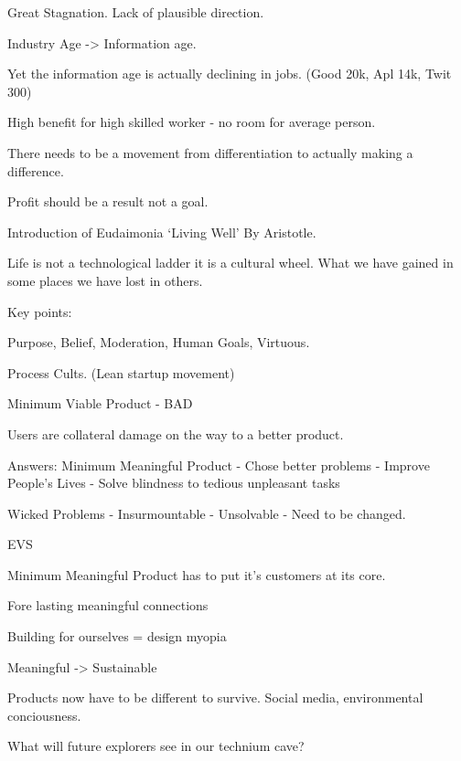 Great Stagnation. Lack of plausible direction.

Industry Age -> Information age.

Yet the information age is actually declining in jobs. (Good 20k, Apl 14k, Twit 300)

High benefit for high skilled worker - no room for average person.

There needs to be a movement from differentiation to actually making a difference.

Profit should be a result not a goal.

Introduction of Eudaimonia `Living Well' By Aristotle. 

Life is not a technological ladder it is a cultural wheel. What we have gained in some places we have lost in others.

Key points:

Purpose, Belief, Moderation, Human Goals, Virtuous.

Process Cults. (Lean startup movement)

Minimum Viable Product - BAD

Users are collateral damage on the way to a better product.

Answers: Minimum Meaningful Product
- Chose better problems
- Improve People's Lives
- Solve blindness to tedious unpleasant tasks

Wicked Problems
- Insurmountable
- Unsolvable
- Need to be changed.

EVS

Minimum Meaningful Product has to put it's customers at its core.

Fore lasting meaningful connections

Building for ourselves = design myopia

Meaningful -> Sustainable

Products now have to be different to survive. Social media, environmental conciousness.

What will future explorers see in our technium cave?



